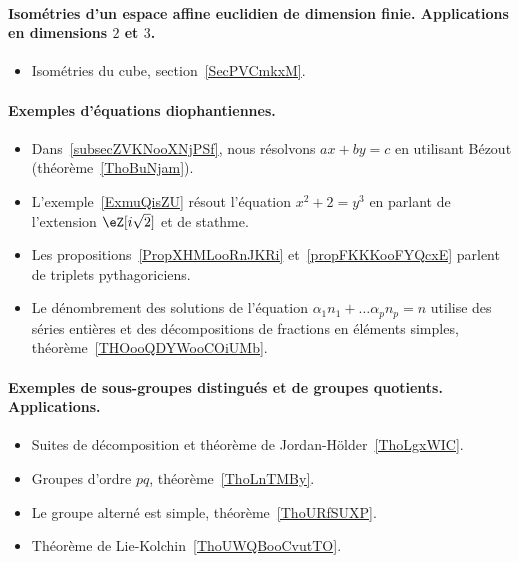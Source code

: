 \paragraph{Isométries d'un espace affine euclidien de dimension finie. Applications en dimensions $2$ et $3$.}
\begin{itemize}
	\item Isométries du cube, section~\ref{SecPVCmkxM}.
\end{itemize}
\paragraph{Exemples d’équations diophantiennes.}
\begin{itemize}
	\item Dans~\ref{subsecZVKNooXNjPSf}, nous résolvons \( ax+by=c\) en utilisant Bézout (théorème~\ref{ThoBuNjam}).
	\item L'exemple~\ref{ExmuQisZU} résout l'équation \( x^2+2=y^3\) en parlant de l'extension \( \eZ[i\sqrt{2}]\) et de stathme.
	\item Les propositions~\ref{PropXHMLooRnJKRi} et~\ref{propFKKKooFYQcxE} parlent de triplets pythagoriciens.
	\item Le dénombrement des solutions de l'équation \( \alpha_1 n_1+\ldots \alpha_pn_p=n\) utilise des séries entières et des décompositions de fractions en éléments simples, théorème~\ref{THOooQDYWooCOiUMb}.
\end{itemize}
\paragraph{Exemples de sous-groupes distingués et de groupes quotients. Applications.}
\begin{itemize}
	\item Suites de décomposition et théorème de Jordan-Hölder~\ref{ThoLgxWIC}.
	\item Groupes d'ordre \( pq\), théorème~\ref{ThoLnTMBy}.
	\item Le groupe alterné est simple, théorème~\ref{ThoURfSUXP}.
	\item Théorème de Lie-Kolchin~\ref{ThoUWQBooCvutTO}.
\end{itemize}

